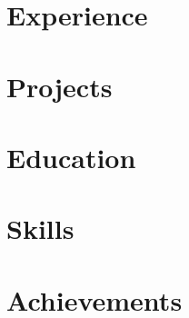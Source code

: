 \documentclass[letter,10pt]{article}
\begin{document}
\thispagestyle{fancy}



\section{Experience}


\section{Projects}




\section{Education}


\section{Skills}


% 

\section{Achievements}


% 

% 

% 
\end{document}
